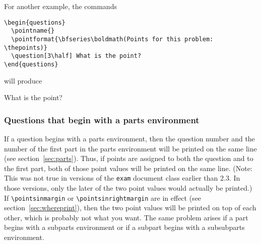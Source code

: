 \documentclass[12pt]{exam}
\makeatletter
\newcommand{\indc}[1]{\index{#1@\texttt{\char`\\#1}}}
\makeatother
\begin{document}
For another example, the commands\indc{pointformat}\indc{boldmath}
\begin{verbatim}
\begin{questions}
  \pointname{}
  \pointformat{\bfseries\boldmath(Points for this problem: \thepoints)}
  \question[3\half] What is the point?  
\end{questions}
\end{verbatim}
will produce
\begin{questions}
  \pointname{}
  \question[3\half] What is the point?  
\end{questions}
\noboxedpoints
\nopointsinmargin
\pointname{ \points}


\subsubsection{Questions that begin with a parts environment}

If a question begins with a parts environment, then the question
number and the number of the first part in the parts environment will
be printed on the same line (see section~\ref{sec:parts}).  Thus, if
points are assigned to both the question and to the first part, both
of those point values will be printed on the same line.  (Note: This
was not true in versions of the \verb"exam" document class earlier
than 2.3.  In those versions, only the later of the two point values
would actually be printed.)  If \verb"\pointsinmargin" or
\verb"\pointsinrightmargin" are in effect (see
section~\ref{sec:whereprint}), then the two point values will be
printed on top of each other, which is probably not what you want.
The same problem arises if a part begins with a subparts environment
or if a subpart begins with a subsubparts environment.
\end{document}
